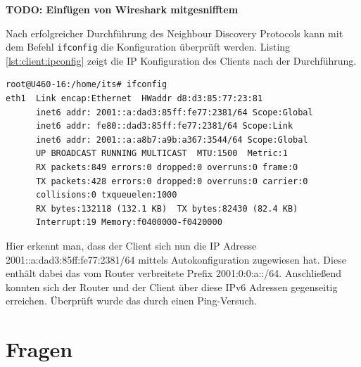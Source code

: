\documentclass[a4paper,12pt]{article} %
\begin{document}
\textbf{TODO: Einfügen von Wireshark mitgesnifftem}

Nach erfolgreicher Durchführung des Neighbour Discovery Protocols kann mit dem Befehl \verb!ifconfig! die Konfiguration überprüft werden. Listing \ref{lst:client:ipconfig} zeigt die IP Konfiguration des Clients nach der Durchführung.
\begin{lstlisting}[style=code,caption={IP Konfiguration des Clients},label=lst:client:ipconfig]
root@U460-16:/home/its# ifconfig
eth1  Link encap:Ethernet  HWaddr d8:d3:85:77:23:81  
      inet6 addr: 2001::a:dad3:85ff:fe77:2381/64 Scope:Global
      inet6 addr: fe80::dad3:85ff:fe77:2381/64 Scope:Link
      inet6 addr: 2001::a:a8b7:a9b:a367:3544/64 Scope:Global
      UP BROADCAST RUNNING MULTICAST  MTU:1500  Metric:1
      RX packets:849 errors:0 dropped:0 overruns:0 frame:0
      TX packets:428 errors:0 dropped:0 overruns:0 carrier:0
      collisions:0 txqueuelen:1000 
      RX bytes:132118 (132.1 KB)  TX bytes:82430 (82.4 KB)
      Interrupt:19 Memory:f0400000-f0420000  
\end{lstlisting}
Hier erkennt man, dass der Client sich nun die IP Adresse 2001::a:dad3:85ff:fe77:2381/64 mittels Autokonfiguration zugewiesen hat. Diese enthält dabei das vom Router verbreitete Prefix 2001:0:0:a::/64.
Anschließend konnten sich der Router und der Client über diese IPv6 Adressen gegenseitig erreichen. Überprüft wurde das durch einen Ping-Versuch.

\section{Fragen}
\end{document}
